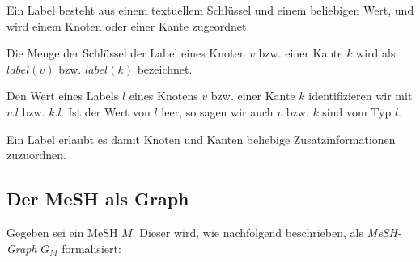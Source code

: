 \begin{definition}
 Ein Label besteht aus einem textuellem Schlüssel und einem beliebigen Wert, und wird einem Knoten oder einer Kante zugeordnet. \par

 Die Menge der Schlüssel der Label eines Knoten $v$ bzw. einer Kante $k$ wird als $label(v)$ bzw. $label(k)$ bezeichnet. \par 

 Den Wert eines Labels $l$ eines Knotens $v$ bzw. einer Kante $k$ identifizieren wir mit $v.l$ bzw. $k.l$. Ist der Wert von $l$ leer, so sagen wir auch $v$ bzw. $k$ sind vom Typ $l$. \par

 Ein Label erlaubt es damit Knoten und Kanten beliebige Zusatzinformationen zuzuordnen.
\end{definition}



\subsection{Der MeSH als Graph}
\label{sec:repräsentation_des_mesh_als_baum}
Gegeben sei ein MeSH $M$. Dieser wird, wie nachfolgend beschrieben, als \textit{MeSH-Graph} $G_M$ formalisiert: 

